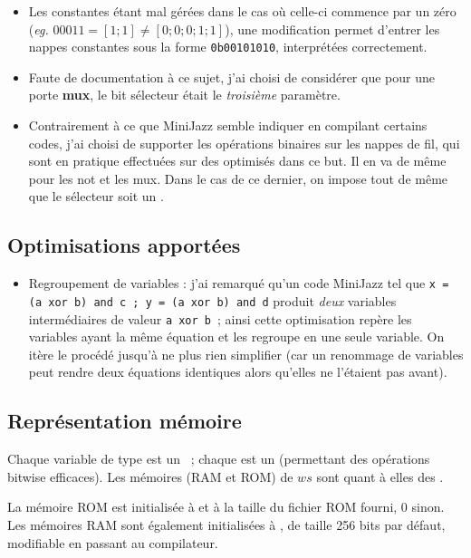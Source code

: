 \documentclass[11pt,a4paper]{article}
\begin{document}
\begin{itemize}
\item Les constantes  étant mal gérées dans le cas où celle-ci commence par un zéro (\textit{eg.} $00011 = [1;1] \neq [0;0;0;1;1]$), une modification permet d'entrer les nappes constantes sous la forme \lstinline`0b00101010`, interprétées correctement.
\item Faute de documentation à ce sujet, j'ai choisi de considérer que pour une porte \textbf{mux}, le bit sélecteur était le \emph{troisième} paramètre.
\item Contrairement à ce que MiniJazz semble indiquer en compilant certains codes, j'ai choisi de supporter les opérations binaires sur les nappes de fil, qui sont en pratique effectuées sur des  optimisés dans ce but. Il en va de même pour les not et les mux. Dans le cas de ce dernier, on impose tout de même que le sélecteur soit un .
\end{itemize}

\subsection{Optimisations apportées} \label{sec:opti}

\begin{itemize}
\item Regroupement de variables : j'ai remarqué qu'un code MiniJazz tel que \lstinline`x = (a xor b) and c ; y = (a xor b) and d` produit \emph{deux} variables intermédiaires de valeur \lstinline`a xor b`~; ainsi cette optimisation repère les variables ayant la même équation et les regroupe en une seule variable. On itère le procédé jusqu'à ne plus rien simplifier (car un renommage de variables peut rendre deux équations identiques alors qu'elles ne l'étaient pas avant).
\end{itemize}

\subsection{Représentation mémoire} \label{sec:memory}

Chaque variable de type  est un ~; chaque  est un  (permettant des opérations bitwise efficaces). Les mémoires (RAM et ROM) de  $ws$ sont quant à elles des .

La mémoire ROM est initialisée à  et à la taille du fichier ROM fourni, 0 sinon. Les mémoires RAM sont également initialisées à , de taille 256 bits par défaut, modifiable en passant  au compilateur.
\end{document}
